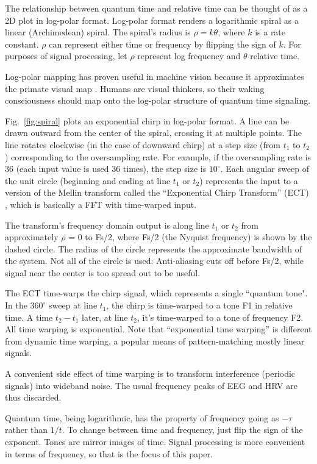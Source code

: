 The relationship between quantum time and relative time can be thought of as a
2D plot in log-polar format.
Log-polar format renders a logarithmic spiral as a linear (Archimedean) spiral.
The spiral's radius is $\rho = k\theta$, where $k$ is a rate constant.
$\rho$ can represent either time or frequency by flipping the sign of $k$.
For purposes of signal processing, let $\rho$ represent log frequency and
$\theta$ relative time.

Log-polar mapping has proven useful in machine vision \cite{Bonmassar}
because it approximates the primate visual map \cite{Schwartz}.
Humans are visual thinkers, so their waking consciousness should map onto the
log-polar structure of quantum time signaling.

Fig.~\ref{fig:spiral} plots an exponential chirp in log-polar format.
A line can be drawn outward from the center of the spiral, crossing it at
multiple points.
The line rotates clockwise (in the case of downward chirp) at a step size
(from $t_1$ to $t_2$) corresponding to the oversampling rate.
For example, if the oversampling rate is 36 (each input value is used 36 times),
the step size is $10^{\circ}$.
Each angular sweep of the unit circle
(beginning and ending at line $t_1$ or $t_2$)
represents the input to a version of the Mellin transform called the
``Exponential Chirp Transform'' (ECT) \cite{Bonmassar}, which is
basically a FFT with time-warped input.

The transform's frequency domain output is along line $t_1$ or $t_2$ from
approximately $\rho$ = 0 to Fs/2, where Fs/2 (the Nyquist frequency)
is shown by the dashed circle.
The radius of the circle represents the approximate bandwidth of the system.
Not all of the circle is used: Anti-aliasing cuts off before Fs/2, while signal
near the center is too spread out to be useful.

The ECT time-warps the chirp signal, which represents a single ``quantum tone".
In the $360^{\circ}$ sweep at line $t_1$,
the chirp is time-warped to a tone F1 in relative time.
A time $t_2-t_1$ later, at line $t_2$,
it's time-warped to a tone of frequency F2.
All time warping is exponential.
Note that ``exponential time warping'' is different from dynamic time warping,
a popular means of pattern-matching mostly linear signals.

A convenient side effect of time warping is to transform interference
(periodic signals) into wideband noise.
The usual frequency peaks of EEG and HRV are thus discarded.

Quantum time, being logarithmic, has the property of frequency going as
$-\tau$ rather than $1/t$.
To change between time and frequency, just flip the sign of the exponent.
Tones are mirror images of time.
Signal processing is more convenient in terms of frequency,
so that is the focus of this paper.

